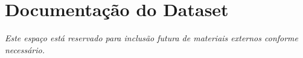 \chapter{Documentação do Dataset}
\label{cap:anexo}

%
%

\textit{Este espaço está reservado para inclusão futura de materiais externos conforme necessário.}

